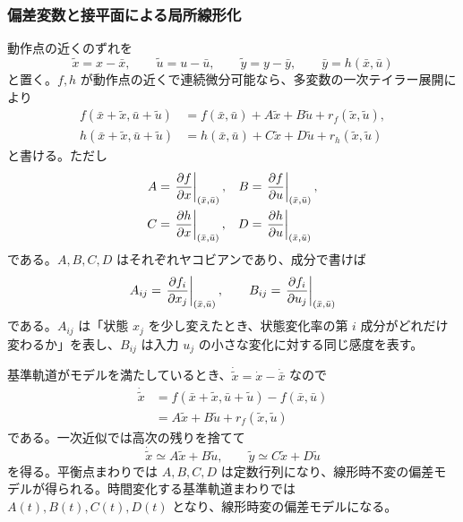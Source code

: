 \subsubsection{偏差変数と接平面による局所線形化}

動作点の近くのずれを
\begin{equation}
  \tilde{x}=x-\bar{x},\qquad
  \tilde{u}=u-\bar{u},\qquad
  \tilde{y}=y-\bar{y},
  \qquad
  \bar{y}=h(\bar{x},\bar{u})
\end{equation}
と置く。$f,h$ が動作点の近くで連続微分可能なら、多変数の一次テイラー展開により
\begin{align}
  f(\bar{x}+\tilde{x},\bar{u}+\tilde{u})
  &=f(\bar{x},\bar{u})+A\tilde{x}+B\tilde{u}+r_f(\tilde{x},\tilde{u}),\\
  h(\bar{x}+\tilde{x},\bar{u}+\tilde{u})
  &=h(\bar{x},\bar{u})+C\tilde{x}+D\tilde{u}+r_h(\tilde{x},\tilde{u})
\end{align}
と書ける。ただし
\begin{align}
  A&=\left.\frac{\partial f}{\partial x}\right|_{(\bar{x},\bar{u})},
  &B&=\left.\frac{\partial f}{\partial u}\right|_{(\bar{x},\bar{u})},\\
  C&=\left.\frac{\partial h}{\partial x}\right|_{(\bar{x},\bar{u})},
  &D&=\left.\frac{\partial h}{\partial u}\right|_{(\bar{x},\bar{u})}
\end{align}
である。$A,B,C,D$ はそれぞれヤコビアンであり、成分で書けば
\begin{equation}
  A_{ij}=\left.\frac{\partial f_i}{\partial x_j}\right|_{(\bar{x},\bar{u})},
  \qquad
  B_{ij}=\left.\frac{\partial f_i}{\partial u_j}\right|_{(\bar{x},\bar{u})}
\end{equation}
である。$A_{ij}$ は「状態 $x_j$ を少し変えたとき、状態変化率の第 $i$ 成分がどれだけ変わるか」を表し、$B_{ij}$ は入力 $u_j$ の小さな変化に対する同じ感度を表す。

基準軌道がモデルを満たしているとき、$\dot{\tilde{x}}=\dot{x}-\dot{\bar{x}}$ なので
\begin{align}
  \dot{\tilde{x}}
  &=f(\bar{x}+\tilde{x},\bar{u}+\tilde{u})-f(\bar{x},\bar{u})\\
  &=A\tilde{x}+B\tilde{u}+r_f(\tilde{x},\tilde{u})
\end{align}
である。一次近似では高次の残りを捨てて
\begin{equation}
  \dot{\tilde{x}}\simeq A\tilde{x}+B\tilde{u},
  \qquad
  \tilde{y}\simeq C\tilde{x}+D\tilde{u}
\end{equation}
を得る。平衡点まわりでは $A,B,C,D$ は定数行列になり、線形時不変の偏差モデルが得られる。時間変化する基準軌道まわりでは $A(t),B(t),C(t),D(t)$ となり、線形時変の偏差モデルになる。

